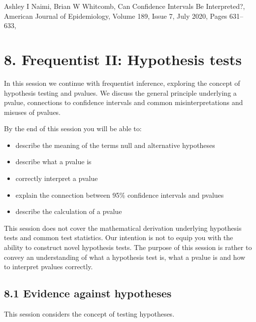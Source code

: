 \documentclass[letterpaper,10pt,english]{jupyterBook}
\begin{document}
\sphinxAtStartPar
Ashley I Naimi, Brian W Whitcomb, Can Confidence Intervals Be Interpreted?, American Journal of Epidemiology, Volume 189, Issue 7, July 2020, Pages 631–633, 


\chapter{8. Frequentist II: Hypothesis tests}
\label{\detokenize{08.a. Frequentist II:frequentist-ii-hypothesis-tests}}\label{\detokenize{08.a. Frequentist II::doc}}
\sphinxAtStartPar
In this session we continue with frequentist inference, exploring the concept of hypothesis testing and p\sphinxhyphen{}values. We discuss the general principle underlying a p\sphinxhyphen{}value, connections to confidence intervals and common misinterpretations and misuses of p\sphinxhyphen{}values.



\sphinxAtStartPar
By the end of this session you will be able to:
\begin{itemize}
\item {} 
\sphinxAtStartPar
describe the meaning of the terms null and alternative hypotheses

\item {} 
\sphinxAtStartPar
describe what a p\sphinxhyphen{}value is

\item {} 
\sphinxAtStartPar
correctly interpret a p\sphinxhyphen{}value

\item {} 
\sphinxAtStartPar
explain the connection between 95\% confidence intervals and p\sphinxhyphen{}values

\item {} 
\sphinxAtStartPar
describe the calculation of a p\sphinxhyphen{}value

\end{itemize}



\sphinxAtStartPar
This session does not cover the mathematical derivation underlying hypothesis tests and common test statistics. Our intention is not to equip you with the ability to construct novel hypothesis tests. The purpose of this session is rather to convey an understanding of what a hypothesis test is, what a p\sphinxhyphen{}value is and how to interpret p\sphinxhyphen{}values correctly.


\section{8.1 Evidence against hypotheses}
\label{\detokenize{08.b. Frequentist II:evidence-against-hypotheses}}\label{\detokenize{08.b. Frequentist II::doc}}
\sphinxAtStartPar
This session considers the concept of testing hypotheses.
\end{document}
